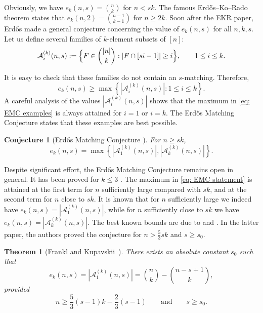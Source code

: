 \documentclass{article}
\newtheorem{conj}{Conjecture}
\newtheorem{theorem}{Theorem}
\begin{document}
Obviously, we have $e_k(n, s) = {n \choose k}$ for $n < sk$. The famous Erd\H{o}s--Ko--Rado theorem \cite{EKR} states that $e_k(n, 2) = {n - 1 \choose k - 1}$ for $n \geq 2k$. Soon after the EKR paper, Erd\H{o}s made a general conjecture concerning the value of $e_k(n, s)$ for all $n, k, s$. Let us define several families of $k$-element subsets of $[n]$:
\begin{equation}\label{eq: frankl families}
\mathcal{A}_i^{(k)}(n,s) := \Bigl\{F\in {[n]\choose k}:|F\cap [si-1]|\ge i\Bigr\}, \qquad 1\le i\le k.
\end{equation}

It is easy to check that these families do not contain an $s$-matching. Therefore,
\begin{equation} \label{eq: EMC examples}
e_k(n, s) \geq \max\left\{|\mathcal{A}_i^{(k)}(n,s)| : 1 \leq i \leq k\right\}.
\end{equation}
A careful analysis of the values $|\mathcal{A}_i^{(k)}(n,s)|$ shows that the maximum in \eqref{eq: EMC examples} is always attained for $i = 1$ or $i = k$. The Erd\H{o}s Matching Conjecture states that these examples are best possible.

\begin{conj}[Erd\H{o}s Matching Conjecture \cite{E}]\label{conj: EMC}
For $n\ge sk$,
\begin{equation}\label{eq: EMC statement}
e_k(n,s) = \max\left\{|\mathcal{A}_1^{(k)}(n,s)|,|\mathcal{A}_k^{(k)}(n,s)|\right\}.
\end{equation}
\end{conj}

Despite significant effort, the Erd\H{o}s Matching Conjecture remains open in general. It has been proved for $k\le 3$ \cite{EG, F11}. The maximum in \eqref{eq: EMC statement} is attained at the first term for $n$ sufficiently large compared with $sk$, and at the second term for $n$ close to $sk$. It is known that for $n$ sufficiently large we indeed have $e_k(n, s) = |\mathcal{A}_1^{(k)}(n,s)|$, while for $n$ sufficiently close to $sk$ we have $e_k(n, s) = |\mathcal{A}_k^{(k)}(n,s)|$. The best known bounds are due to \cite{F4} and \cite{FK21}. In the latter paper, the authors proved the conjecture for $n>\frac 53sk$ and $s\ge s_0$.

\begin{theorem}[Frankl and Kupavskii~\cite{FK21}] \label{t: Frankl-Kupavskii EMC}
    There exists an absolute constant $s_0$ such that
    \begin{equation}\label{eq: EMC big n}
        e_k(n,s) = |\mathcal{A}_1^{(k)}(n,s)| = {n \choose k} - {n - s + 1 \choose k},
    \end{equation}
    provided
    \[
    n \geq \frac{5}{3}(s-1)k - \frac{2}{3}(s-1)
    \qquad\text{and}\qquad
    s \geq s_0.
    \]
\end{theorem}
\end{document}
